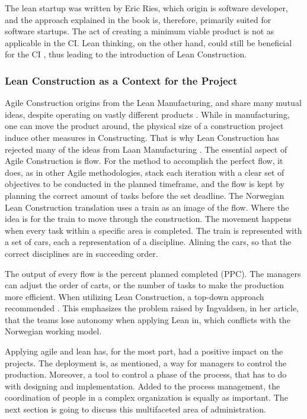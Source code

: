 The lean startup was written by Eric Ries, which origin is software developer, and the approach explained in the book is, therefore, primarily suited for software startups. The act of creating a minimum viable product is not as applicable in the CI. Lean thinking, on the other hand, could still be beneficial for the CI \cite{owen2006agile}, thus leading to the introduction of Lean Construction. 

\subsubsection{Lean Construction as a Context for the Project}\label{sec:lean_construction}
Agile Construction origins from the Lean Manufacturing, and share many mutual ideas, despite operating on vastly different products \cite{salem2006lean}. While in manufacturing, one can move the product around, the physical size of a construction project induce other measures in Constructing. That is why Lean Construction has rejected many of the ideas from Laan Manufacturing \cite{howell1999lean}. The essential aspect of Agile Construction is flow. For the method to accomplish the perfect flow, it does, as in other Agile methodologies, stack each iteration with a clear set of objectives to be conducted in the planned timeframe, and the flow is kept by planning the correct amount of tasks before the set deadline. The Norwegian Lean Construction translation uses a train as an image of the flow. Where the idea is for the train to move through the construction. The movement happens when every task within a specific area is completed. The train is represented with a set of cars, each a representation of a discipline. Alining the cars, so that the correct disciplines are in succeeding order.

The output of every flow is the percent planned completed (PPC). The managers can adjust the order of carts, or the number of tasks to make the production more efficient. When utilizing Lean Construction, a top-down approach recommended \cite{lean_i_praksis}. This emphasizes the problem raised by Ingvaldsen, in her article, that the teams lose autonomy when applying Lean in, which conflicts with the Norwegian working model. 

Applying agile and lean has, for the most part, had a positive impact on the projects. The deployment is, as mentioned, a way for managers to control the production. Moreover, a tool to control a phase of the process, that has to do with designing and implementation. Added to the process management, the coordination of people in a complex organization is equally as important. The next section is going to discuss this multifaceted area of administration.

